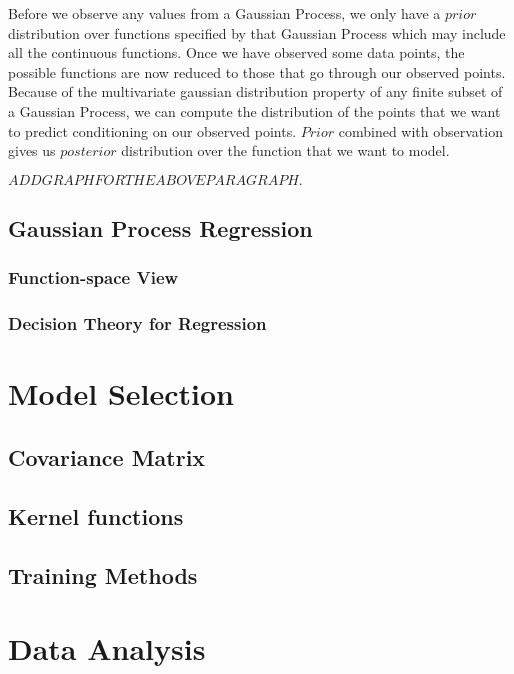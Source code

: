 \documentclass[[11pt,twoside,a4paper]{article}
\theoremstyle{definition}
\numberwithin{equation}{section}
\begin{document}
Before we observe any values from a Gaussian Process, we only have a $prior$ distribution over functions specified by that Gaussian Process which may include all the continuous functions. Once we have observed some data points, the possible functions are now reduced to those that go through our observed points. Because of the multivariate gaussian distribution property of any finite subset of a Gaussian Process, we can compute the distribution of the points that we want to predict conditioning on our observed points. $Prior$ combined with observation gives us $posterior$ distribution over the function that we want to model.

$ADD GRAPH FOR THE ABOVE PARAGRAPH.$





\subsection{Gaussian Process Regression}

\subsubsection{Function-space View}

\subsubsection{Decision Theory for Regression}

\newpage
\section{Model Selection}

\subsection{Covariance Matrix}

\subsection{Kernel functions}

\subsection{Training Methods}

\newpage
\section{Data Analysis}
\end{document}

